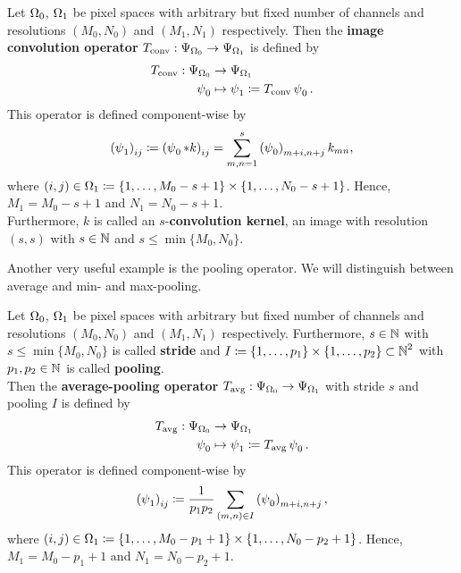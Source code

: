 \begin{definition}\label{def:convolution_op}
Let $\Omega_0$, $\Omega_1$ be pixel spaces with arbitrary but fixed number of channels and resolutions $(M_0,N_0)$ and $(M_1,N_1)$ respectively. Then the \textbf{image convolution operator} $T_{\text{conv}}: \Psi_{\Omega_0} \to \Psi_{\Omega_1}$ is defined by
\begin{align*}
T_{\text{conv}}: \Psi_{\Omega_0} &\to \Psi_{\Omega_1}\\
\operatorname{\psi}_0 &\mapsto \operatorname{\psi}_1 \coloneqq T_{\text{conv}}\operatorname{\psi}_0 .
\end{align*}
This operator is defined component-wise by
\begin{align}
\left( \operatorname{\psi}_1 \right)_{ij} \coloneqq  \left( \operatorname{\psi}_0 \ast k \right)_{ij} = \sum_{m,n=1}^s \left(\operatorname{\psi}_0\right)_{m+i,n+j}k_{mn},
\end{align}
where $(i,j) \in \Omega_1 \coloneqq \{1,\ldots, M_0-s+1\} \times \{1,\ldots, N_0-s+1\}$. Hence, $M_1 = M_0-s+1$ and $N_1 = N_0-s+1$.\\
Furthermore, $k$ is called an $s$-\textbf{convolution kernel}, an image with resolution $(s,s)$ with $s\in\operatorname{\mathbb{N}}$ and $s\leq \min\{M_0,N_0\}$.
\end{definition}

Another very useful example is the pooling operator. We will distinguish between average and min- and max-pooling.

\begin{definition}\label{def:avg_pooling_op}
Let $\Omega_0$, $\Omega_1$ be pixel spaces with arbitrary but fixed number of channels and resolutions $(M_0,N_0)$ and $(M_1,N_1)$ respectively. Furthermore, $s\in\operatorname{\mathbb{N}}$ with $s\leq \min\{M_0,N_0\}$ is called \textbf{stride} and $I\coloneqq \{1,\ldots,p_1\}\times \{1,\ldots,p_2\} \subset\operatorname{\mathbb{N}}^2$ with $p_1,p_2\in\operatorname{\mathbb{N}}$ is called \textbf{pooling}.\\
Then the \textbf{average-pooling operator} $T_{\text{avg}}: \Psi_{\Omega_0} \to \Psi_{\Omega_1}$ with stride $s$ and pooling $I$ is defined by
\begin{align*}
T_{\text{avg}}: \Psi_{\Omega_0} &\to \Psi_{\Omega_1}\\
\operatorname{\psi}_0 &\mapsto \operatorname{\psi}_1 \coloneqq T_{\text{avg}}\operatorname{\psi}_0 .
\end{align*}
This operator is defined component-wise by
\begin{align}
\left(\operatorname{\psi}_1\right)_{ij} \coloneqq  \frac{1}{p_1p_2} \sum_{(m,n)\in I}\left(\operatorname{\psi}_0\right)_{m+i, n+j},
\end{align}
where $(i,j) \in \Omega_1 \coloneqq \{1,\ldots, M_0-p_1+1\} \times \{1,\ldots, N_0-p_2+1\}$. Hence, $M_1 = M_0-p_1+1$ and $N_1 = N_0-p_2+1$.
\end{definition}

